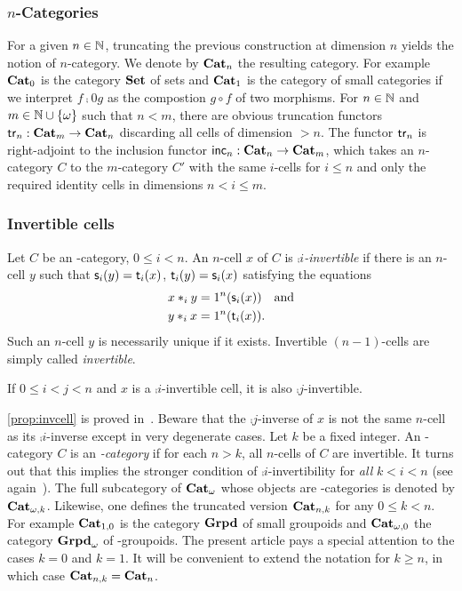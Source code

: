 \subsubsection{$n$-Categories}\label{ssubsec:ncat}
For a given $n\in\mathbb N$, truncating the previous construction at dimension $n$ yields the notion of $n$-category.  We denote by $\mathbf{Cat}_{n}$ the resulting category. For example $\mathbf{Cat}_{0}$ is the category $\mathbf{Set}$ of sets and $\mathbf{Cat}_{1}$ is the category of small categories if we interpret $f\comp 0 g$ as the compostion $g\circ f$ of two morphisms.
For $n\in\mathbb N$ and $m\in\mathbb N\cup \left\{\omega\right\}$ such that $n<m$, there are 
obvious truncation functors $\mathsf{tr}_{n}:\mathbf{Cat}_{m}\to \mathbf{Cat}_{n}$ discarding all cells of dimension $>n$. The functor $\mathsf{tr}_{n}$ is right-adjoint to the inclusion functor  $\mathsf{inc}_{n}:\mathbf{Cat}_{n}\to\mathbf{Cat}_{m}$, which takes an $n$-category $C$ to the $m$-category $C'$ with the same $i$-cells for $i\leq n$ and only the required identity cells in dimensions $n<i\leq m$.

\subsubsection{Invertible cells}\label{ssubsec:invert}
Let $C$ be an \oo-category, $0\leq i <n$. An $n$-cell $x$ of $C$ is {\em $\comp i$-invertible} if there is an $n$-cell $y$ such that $\mathsf{s}_{i}(y)=\mathsf{t}_{i}(x)$, $\mathsf{t}_{i}(y)=\mathsf{s}_{i}(x)$ satisfying the equations 
  \begin{align*}
    x\ast_{i} y & = 1^{n}(\mathsf{s}_{i}(x)) \quad \hbox{and}\\
    y\ast_{i} x & =  1^{n}(\mathsf{t}_{i}(x)).
  \end{align*}
  Such an $n$-cell $y$ is necessarily unique if it exists. Invertible
  $(n{-}1)$-cells are simply called {\em invertible}. 
  \begin{proposition}\label{prop:invcell}
    If $0\leq i< j<n$ and $x$ is a $\comp i$-invertible cell, it is also $\comp j$-invertible.
  \end{proposition}
  \begin{paragr}
    \cref{prop:invcell} is proved
    in~\cite[14.5]{abgmmm:polybk}. Beware that the $\comp j$-inverse
    of $x$ is not the same $n$-cell as its $\comp i$-inverse except in
    very degenerate cases. Let $k$ be a fixed integer. An \oo-category
    $C$ is an {\em {}-category} if for each $n>k$, all $n$-cells
    of $C$ are invertible. It turns out that this implies the stronger
    condition of $\comp i$-invertibility for {\em all} $k<i<n$ (see
    again~\cite[14.5]{abgmmm:polybk}).  The full subcategory of
    $\mathbf{Cat}_{\omega}$ whose objects are -categories is denoted by $\mathbf{Cat}_{\omega,k}$. Likewise, one defines the truncated version $\mathbf{Cat}_{n,k}$ for
    any $0\leq k<n$.  For example $\mathbf{Cat}_{1,0}$ is the category $\mathbf{Grpd}$
    of small groupoids and $\mathbf{Cat}_{\omega,0}$ the category $\mathbf{Grpd}_{\omega}$ of
    \oo-groupoids. The present article pays a special attention to the
    cases $k=0$ and $k=1$. It will be convenient to extend the
    notation for $k\geq n$, in which case $\mathbf{Cat}_{n,k}=\mathbf{Cat}_{n}$.
 \end{paragr} 


